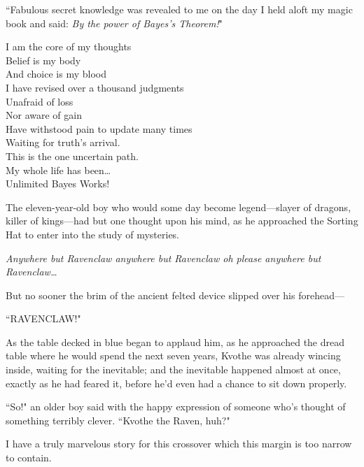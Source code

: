 ``Fabulous secret knowledge was revealed to me on the day I held aloft my magic book and said: \emph{By the power of Bayes's Theorem!}"


\begin{emph}
I am the core of my thoughts\\
Belief is my body\\
And choice is my blood\\
I have revised over a thousand judgments\\
Unafraid of loss\\
Nor aware of gain\\
Have withstood pain to update many times\\
Waiting for truth's arrival.\\
This is the one uncertain path.\\
My whole life has been{\ldots}\\
Unlimited Bayes Works!
\end{emph}


The eleven-year-old boy who would some day become legend—slayer of dragons, killer of kings—had but one thought upon his mind, as he approached the Sorting Hat to enter into the study of mysteries.

\emph{Anywhere but Ravenclaw anywhere but Ravenclaw oh please anywhere but Ravenclaw{\ldots}}

But no sooner the brim of the ancient felted device slipped over his forehead—

``RAVENCLAW!"

As the table decked in blue began to applaud him, as he approached the dread table where he would spend the next seven years, Kvothe was already wincing inside, waiting for the inevitable; and the inevitable happened almost at once, exactly as he had feared it, before he'd even had a chance to sit down properly.

``So!" an older boy said with the happy expression of someone who's thought of something terribly clever. ``Kvothe the Raven, huh?"


I have a truly marvelous story for this crossover which this margin is too narrow to contain.


